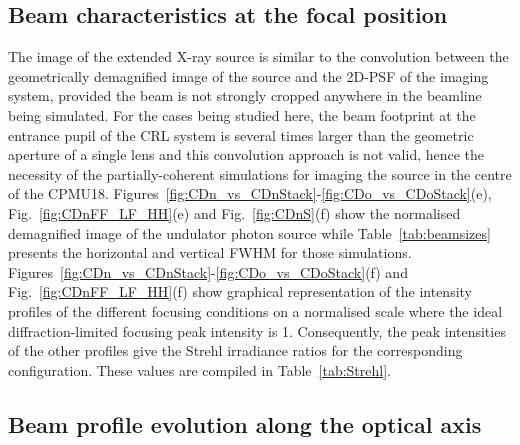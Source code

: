 \begin{refsection}

\subsection{Beam characteristics at the focal position}\label{sec:source_image_sim}

The image of the extended X-ray source is similar to the convolution between the geometrically demagnified image of the source and the 2D-PSF of the imaging system, provided the beam is not strongly cropped anywhere in the beamline being simulated. For the cases being studied here, the beam footprint at the entrance pupil of the CRL system is several times larger than the geometric aperture of a single lens and this convolution approach is not valid, hence the necessity of the partially-coherent simulations for imaging the source in the centre of the CPMU18. Figures~\ref{fig:CDn_vs_CDnStack}-\ref{fig:CDo_vs_CDoStack}(e), Fig.~\ref{fig:CDnFF_LF_HH}(e) and Fig.~\ref{fig:CDnS}(f) show the normalised demagnified image of the undulator photon source while Table~\ref{tab:beamsizes} presents the horizontal and vertical FWHM for those simulations. Figures~\ref{fig:CDn_vs_CDnStack}-\ref{fig:CDo_vs_CDoStack}(f) and Fig.~\ref{fig:CDnFF_LF_HH}(f) show graphical representation of the intensity profiles of the different focusing conditions on a normalised scale where the ideal diffraction-limited focusing peak intensity is 1. Consequently, the peak intensities of the other profiles give the Strehl irradiance ratios for the corresponding configuration. These values are compiled in Table~\ref{tab:Strehl}.

\subsection{Beam profile evolution along the optical axis}\label{sec:partcaustics_sim}


\end{refsection}
